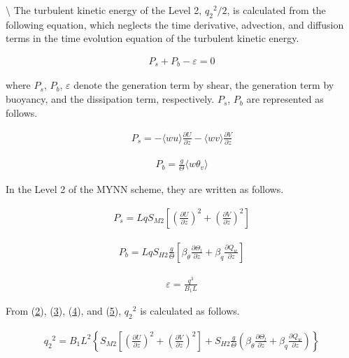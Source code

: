 \textbackslash{} The turbulent kinetic energy of the Level 2,
\({q_2}^2/2\), is calculated from the following equation, which neglects
the time derivative, advection, and diffusion terms in the time
evolution equation of the turbulent kinetic energy.

\begin{eqnarray} P_s + P_b - \varepsilon = 0 \tag{p-dif.2} \end{eqnarray}

where \(P_s\), \(P_b\), \(\varepsilon\) denote the generation term by
shear, the generation term by buoyancy, and the dissipation term,
respectively. \(P_s\), \(P_b\) are represented as follows.

\begin{eqnarray} P_s = -\langle wu \rangle \frac{\partial U}{\partial z} - \langle wv \rangle \frac{\partial V}{\partial z} \end{eqnarray}

\begin{eqnarray} P_b = \frac{g}{\Theta}\langle w\theta_v \rangle \end{eqnarray}

In the Level 2 of the MYNN scheme, they are written as follows.

\begin{eqnarray} P_s = LqS_{M2} \left[ \left(\frac{\partial U}{\partial z}\right)^2 + \left(\frac{\partial V}{\partial z}\right)^2 \right] \tag{p-dif.3} \end{eqnarray}

\begin{eqnarray} P_b = LqS_{H2} \frac{g}{\Theta}\left[ \beta_\theta \frac{\partial \Theta_l}{\partial z} + \beta_q \frac{\partial Q_w}{\partial z} \right] \tag{p-dif.4} \end{eqnarray}

\begin{eqnarray} \varepsilon = \frac{q^3}{B_1 L} \tag{p-dif.5} \end{eqnarray}

From (\href{p-dif.2}{2}), (\href{p-dif.3}{3}), (\href{p-dif.4}{4}), and
(\href{p-dif.5}{5}), \({q_2}^2\) is calculated as follows.

\begin{eqnarray}{q_2}^2=B_1L^2\left\{S_{M2}\left[\left(\frac{\partial U}{\partial z}\right)^2+\left(\frac{\partial V}{\partial z}\right)^2\right]+S_{H2}\frac{g}{\Theta}\left(\beta_\theta \frac{\partial \Theta_l}{\partial z}+\beta_q \frac{\partial Q_w}{\partial z}\right)\right\}\end{eqnarray}

